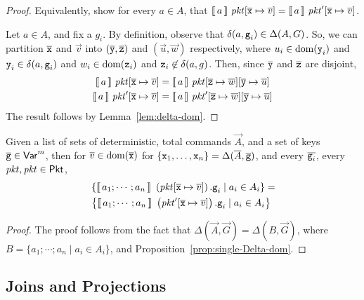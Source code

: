 \begin{proof}
  Equivalently, show for every $a \in A$, that
  $\llbracket\,a\,\rrbracket~\mathit{pkt}[\overline{\texttt{x}} \mapsto \overline{v}] = \llbracket\,a\,\rrbracket~\mathit{pkt}'[\overline{\texttt{x}}
  \mapsto \overline{v}] $.

  Let $a \in A$, and fix a $g_i$. By definition, observe that
  $\delta(a,\texttt{g}_i) \in \Delta(A,G)$. So, we can partition
  $\overline{\texttt{x}}$ and $\vec v$ into $(\overline{\texttt{y}}, \overline{\texttt{z}})$ and
  $(\vec u, \vec w)$ respectively, where $u_i \in \mathrm{dom}(\texttt{y}_i)$ and
  $\texttt{y}_i \in \delta(a,\texttt{g}_i)$ and $w_i \in \mathrm{dom}(\texttt{z}_i)$ and
  $\texttt{z}_i \not\in \delta(a,g)$. Then, since $\overline{\texttt{y}}$ and
  $\overline{\texttt{z}}$ are disjoint,
  \begin{align*}
    \llbracket\,a\,\rrbracket~\mathit{pkt}[\overline{\texttt{x}} \mapsto \overline{v}] &= \llbracket\,a\,\rrbracket~\mathit{pkt}[\overline{\texttt{z}}\mapsto\overline{w}][\overline{\texttt{y}} \mapsto\overline{u}]\\
    \llbracket\,a\,\rrbracket~\mathit{pkt}'[\overline{\texttt{x}} \mapsto \overline{v}] &= \llbracket\,a\,\rrbracket~\mathit{pkt}'[\overline{\texttt{z}}\mapsto\overline{w}][\overline{\texttt{y}} \mapsto\overline{u}]
  \end{align*}
  The result follows by Lemma~\ref{lem:delta-dom}.
\end{proof}

\begin{theorem}
  \label{thm:Delta-dom}
  Given a list of sets of deterministic, total commands $\vec A$, and
  a set of keys $\overline{\texttt{g}} \in \mathsf{Var}^m$, then for
  $\overline{v} \in \mathrm{dom}(\overline{\texttt{x}})$ for
  $\{\texttt{x}_1, \ldots, \texttt{x}_n\} = \Delta(\overline{A},\overline{\texttt{g}})$, and every
  $\overline{\texttt{g}_i}$, every $\mathit{pkt}, \mathit{pkt} \in \mathsf{Pkt}$,
  \begin{align*}
    &\left\{\llbracket\,a_1;\cdots;a_n\,\rrbracket~\left(\mathit{pkt}[\overline{\texttt{x}} \mapsto \overline{v}]\right).\texttt{g}_i \mid a_i \in A_i \right\} = \\
    &\left\{\llbracket\,a_1;\cdots;a_n\,\rrbracket~\left(\mathit{pkt}'[\overline{\texttt{x}} \mapsto \overline{v}]\right).\texttt{g}_i \mid a_i \in A_i \right\}
  \end{align*}
\end{theorem}

\begin{proof}
  The proof follows from the
  fact that $\Delta(\vec A, \vec G) = \Delta(B, \vec G)$, where
  $B = \{a_1; \cdots; a_n \mid a_i \in A_i\}$, and Proposition~\ref{prop:single-Delta-dom}.
\end{proof}

\subsection{Joins and Projections}


